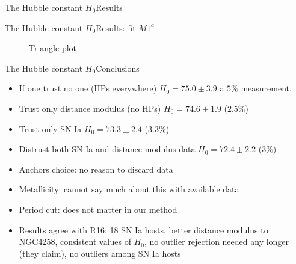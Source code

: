 \documentclass{beamer}
\begin{document}
\begin{frame}{The Hubble constant $H_0$}{Results}
\begin{table}[tbp]
\end{table}
\end{frame}

\begin{frame}{The Hubble constant $H_0$}{Results: fit $M1^a$}

\begin{figure}
Triangle plot
\end{figure}

\end{frame}

\begin{frame}{The Hubble constant $H_0$}{Conclusions}
\begin{itemize}
\item If one trust no one (HPs everywhere) $H_0=75.0\pm3.9$ a $5\%$ measurement.
\item Trust only distance modulus (no HPs) $H_0=74.6\pm1.9$  ($2.5\%$)
\item Trust only SN Ia $H_0=73.3\pm2.4$ ($3.3\%$)
\item Distrust both SN Ia and distance modulus data $H_0=72.4\pm2.2$  ($3\%$) 
\item Anchors choice: no reason to discard data
\item Metallicity: cannot say much about this with available data
\item Period cut: does not matter in our method
\item Results agree with R16: 18 SN Ia hosts, better distance modulus to NGC4258, consistent values of $H_0$, no outlier rejection needed any longer (they claim), no outliers among SN Ia hosts
\end{itemize}
\end{frame}
\end{document}
